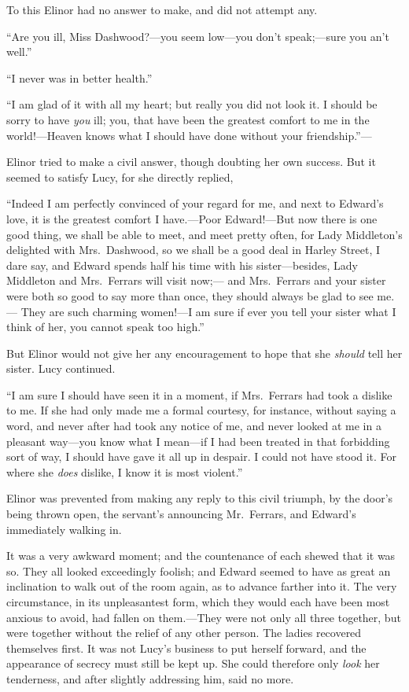 To this Elinor had no answer to make, and did not
attempt any.

``Are you ill, Miss Dashwood?---you seem low---you
don't speak;---sure you an't well.''

``I never was in better health.''

``I am glad of it with all my heart; but really you did
not look it.  I should be sorry to have \emph{you} ill; you, that have
been the greatest comfort to me in the world!---Heaven
knows what I should have done without your friendship.''---%

Elinor tried to make a civil answer, though doubting
her own success.  But it seemed to satisfy Lucy, for she
directly replied,

``Indeed I am perfectly convinced of your regard
for me, and next to Edward's love, it is the greatest
comfort I have.---Poor Edward!---But now there is one
good thing, we shall be able to meet, and meet pretty often,
for Lady Middleton's delighted with Mrs.\ Dashwood,
so we shall be a good deal in Harley Street, I dare say,
and Edward spends half his time with his sister---besides,
Lady Middleton and Mrs.\ Ferrars will visit now;---%
and Mrs.\ Ferrars and your sister were both so good to say
more than once, they should always be glad to see me.---%
They are such charming women!---I am sure if ever you
tell your sister what I think of her, you cannot speak
too high.''

But Elinor would not give her any encouragement
to hope that she \emph{should} tell her sister.  Lucy continued.

``I am sure I should have seen it in a moment,
if Mrs.\ Ferrars had took a dislike to me.  If she had only
made me a formal courtesy, for instance, without saying
a word, and never after had took any notice of me,
and never looked at me in a pleasant way---you know
what I mean---if I had been treated in that forbidding
sort of way, I should have gave it all up in despair.
I could not have stood it.  For where she \emph{does} dislike,
I know it is most violent.''

Elinor was prevented from making any reply to this
civil triumph, by the door's being thrown open, the servant's
announcing Mr.\ Ferrars, and Edward's immediately walking in.

It was a very awkward moment; and the countenance of each
shewed that it was so.  They all looked exceedingly foolish;
and Edward seemed to have as great an inclination to walk
out of the room again, as to advance farther into it.
The very circumstance, in its unpleasantest form,
which they would each have been most anxious to avoid,
had fallen on them.---They were not only all three together,
but were together without the relief of any other person.
The ladies recovered themselves first.  It was not Lucy's
business to put herself forward, and the appearance of
secrecy must still be kept up.  She could therefore only
\emph{look} her tenderness, and after slightly addressing him,
said no more.

